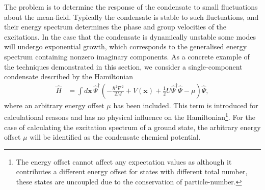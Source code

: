 The problem is to determine the response of the condensate to small fluctuations about the mean-field. Typically the condensate is stable to such fluctuations, and their energy spectrum determines the phase and group velocities of the excitations.  In the case that the condensate is dynamically unstable some modes will undergo exponential growth, which corresponds to the generalised energy spectrum containing nonzero imaginary components. As a concrete example of the techniques demonstrated in this section, we consider a single-component condensate described by the Hamiltonian
\begin{align}
    \label{Peaks:ElementaryExcitationsExampleHamiltonian}
    \hat{H} &= \int d \bm{x}\, \hat{\Psi}^\dagger \left( -\frac{\hbar^2 \nabla^2}{2 M} + V(\bm{x}) + \frac{1}{2} U \hat{\Psi}^\dagger \hat{\Psi} - \mu \right) \hat{\Psi},
\end{align}
where an arbitrary energy offset $\mu$ has been included. This term is introduced for calculational reasons and has no physical influence on the Hamiltonian\footnote{The energy offset cannot affect any expectation values as although it contributes a different energy offset for states with different total number, these states are uncoupled due to the conservation of particle-number.}. For the case of calculating the excitation spectrum of a ground state, the arbitrary energy offset $\mu$ will be identified as the condensate chemical potential.

